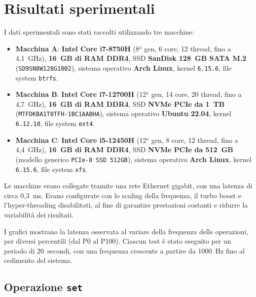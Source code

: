 \section{Risultati sperimentali}
\label{sec:risultati}

I dati sperimentali sono stati raccolti utilizzando tre macchine:
\begin{itemize}
    \item \textbf{Macchina A}: \textbf{Intel Core i7-8750H} (8$^\text{a}$ gen, 6 core, 12 thread, fino a 4{,}1~GHz), \textbf{16~GB di RAM DDR4}, SSD \textbf{SanDisk 128~GB SATA M.2} (\texttt{SD9SN8W128G1002}), sistema operativo \textbf{Arch Linux}, kernel \texttt{6.15.6}, file system \texttt{btrfs}.
    \item \textbf{Macchina B}: \textbf{Intel Core i7-12700H} (12$^\text{a}$ gen, 14 core, 20 thread, fino a 4{,}7~GHz), \textbf{16~GB di RAM DDR4}, SSD \textbf{NVMe PCIe da 1~TB} (\texttt{MTFDKBA1T0TFH-1BC1AABHA}), sistema operativo \textbf{Ubuntu 22.04}, kernel \texttt{6.12.10}, file system \texttt{ext4}.
    \item \textbf{Macchina C}: \textbf{Intel Core i5-12450H} (12$^\text{a}$ gen, 8 core, 12 thread, fino a 4{,}4~GHz), \textbf{16~GB di RAM DDR4}, SSD \textbf{NVMe PCIe da 512~GB} (modello generico \texttt{PCIe-8 SSD 512GB}), sistema operativo \textbf{Arch Linux}, kernel \texttt{6.15.6}, file system \texttt{xfs}.
\end{itemize}

Le macchine erano collegate tramite una rete Ethernet gigabit, con una latenza di circa 0{,}3~ms.
Erano configurate con lo scaling della frequenza, il turbo boost e l'hyper-threading disabilitati, al fine di garantire prestazioni costanti e ridurre la variabilità dei risultati.

I grafici mostrano la latenza osservata al variare della frequenza delle operazioni, per diversi percentili (dal P0 al P100).
Ciascun test è stato eseguito per un periodo di 20~secondi, con una frequenza crescente a partire da 1000~Hz fino al cedimento del sistema.

\subsection{Operazione \texttt{set}}
\label{subsec:risultati-set}

